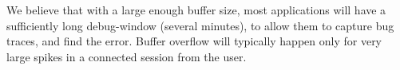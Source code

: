 We believe that with a large enough buffer size, most applications will have a sufficiently long debug-window (several minutes), to allow them to capture bug traces, and find the error.
Buffer overflow will typically happen only for very large spikes in a connected session from the user.


 

